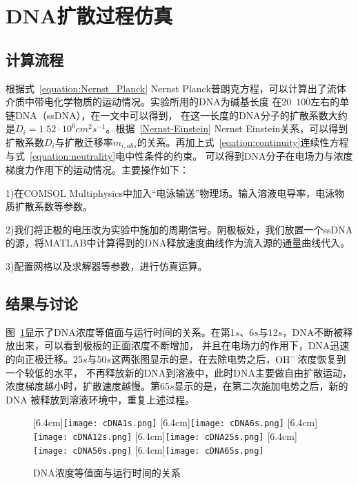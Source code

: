 \section{DNA扩散过程仿真}
\subsection{计算流程}
根据式~\ref{equation:Nernst_Planck} Nernst Planck普朗克方程，可以计算出了流体介质中带电化学物质的运动情况。实验所用的DNA为碱基长度
在$20$~$100$左右的单链DNA（ssDNA），在\parencite{Stellwagen2003}一文中可以得到，
在这一长度的DNA分子的扩散系数大约是$D_i=1.52\cdot 10^6cm^2 s^{-1}$。根据~\ref{Nernst-Einstein} Nernst Einstein关系，可以得到
扩散系数$D_i$与扩散迁移率$m_{i,abs}$的关系。再加上式~\ref{eqation:continuity}连续性方程与式~\ref{equation:neutrality}电中性条件的约束。
可以得到DNA分子在电场力与浓度梯度力作用下的运动情况。主要操作如下：

1)在COMSOL Multiphysics中加入“电泳输送”物理场。输入溶液电导率，电泳物质扩散系数等参数。

2)我们将正极的电压改为实验中施加的周期信号。阴极板处，我们放置一个ssDNA的源，将MATLAB中计算得到的DNA释放速度曲线作为流入源的通量曲线代入。

3)配置网格以及求解器等参数，进行仿真运算。

\subsection{结果与讨论}
图~\ref{fig:cDNA1}显示了DNA浓度等值面与运行时间的关系。在第1$s$、6$s$与12$s$，DNA不断被释放出来，可以看到极板的正面浓度不断增加，
并且在电场力的作用下，DNA迅速的向正极迁移。25$s$与50$s$这两张图显示的是，在去除电势之后，$\ce{OH-}$浓度恢复到一个较低的水平，
不再释放新的DNA到溶液中，此时DNA主要做自由扩散运动，浓度梯度越小时，扩散速度越慢。第65$s$显示的是，在第二次施加电势之后，新的DNA
被释放到溶液环境中，重复上述过程。

\begin{figure}[H]
    \centering
                    [6.4cm]{\texttt{[image: cDNA1s.png]}}
    \hspace{1cm}
                    [6.4cm]{\texttt{[image: cDNA6s.png]}}
    \centering
                    [6.4cm]{\texttt{[image: cDNA12s.png]}}
    \hspace{1cm}
                    [6.4cm]{\texttt{[image: cDNA25s.png]}}
    \centering
                    [6.4cm]{\texttt{[image: cDNA50s.png]}}
    \hspace{1cm}
                    [6.4cm]{\texttt{[image: cDNA65s.png]}}
    \caption{DNA浓度等值面与运行时间的关系}
    \label{fig:cDNA1}
\end{figure}

